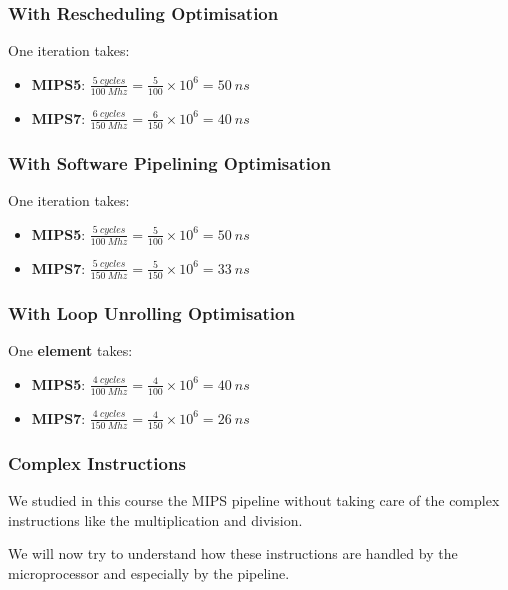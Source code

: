 
\begin{frame}
  \frametitle{With Rescheduling Optimisation}

  One iteration takes:

  \begin{itemize}
    \item
      \textbf{MIPS5}: $\frac{5~cycles}{100~Mhz} =
                       \frac{5}{100} \times 10^{6} =
                       50~ns$
    \item
      \textbf{MIPS7}: $\frac{6~cycles}{150~Mhz} =
                       \frac{6}{150} \times 10^{6} =
                       40~ns$
  \end{itemize}
\end{frame}


\begin{frame}
  \frametitle{With Software Pipelining Optimisation}

  One iteration takes:

  \begin{itemize}
    \item
      \textbf{MIPS5}: $\frac{5~cycles}{100~Mhz} =
                       \frac{5}{100} \times 10^{6} =
                       50~ns$
    \item
      \textbf{MIPS7}: $\frac{5~cycles}{150~Mhz} =
                       \frac{5}{150} \times 10^{6} =
                       33~ns$
  \end{itemize}
\end{frame}


\begin{frame}
  \frametitle{With Loop Unrolling Optimisation}

  One \textbf{element} takes:

  \begin{itemize}
    \item
      \textbf{MIPS5}: $\frac{4~cycles}{100~Mhz} =
                       \frac{4}{100} \times 10^{6} =
                       40~ns$
    \item
      \textbf{MIPS7}: $\frac{4~cycles}{150~Mhz} =
                       \frac{4}{150} \times 10^{6} =
                       26~ns$
  \end{itemize}
\end{frame}


\begin{frame}
  \frametitle{Complex Instructions}

  We studied in this course the MIPS pipeline without taking care of the
  complex instructions like the multiplication and division.

  \-

  We will now try to understand how these instructions are handled by the
  microprocessor and especially by the pipeline.
\end{frame}

